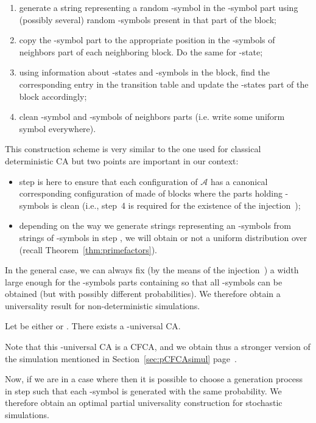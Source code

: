 \documentclass[submission]{fundam}
\newcommand\DELETE[1]{}
\newcommand{\AUTO}[1]{{\ensuremath{\mathcal{#1}}}}
\newcommand\CAA{\AUTO A}
\newcommand\CFCA{\textsf{CFCA}}
\begin{document}
{\begin{enumerate}
\item generate \DELETE{surjectively }a string representing a random -symbol in the \textsf{-symbol} part using (possibly several) random -symbols present in that part of the block;
\item copy the \textsf{-symbol} part to the appropriate position in the \textsf{-symbols of neighbors} part of each neighboring block. Do the same for \textsf{-state};
\item using information about -states and -symbols in the block, find the corresponding entry in the transition table and update the \textsf{-states} part of the block accordingly;
\item clean \textsf{-symbol} and \textsf{-symbols of neighbors} parts (i.e. write some uniform symbol everywhere).
\end{enumerate}

This construction scheme is very similar to the one used for classical deterministic CA but two points are important in our context:
\begin{itemize}
\item step  is here to ensure that each configuration of \CAA{} has a canonical corresponding configuration of  made of blocks where the parts holding -symbols is clean (i.e., step~4 is required for the existence of the injection~);
\item depending on the way we generate strings representing an -symbols from strings of -symbols in step , we will obtain or not a uniform distribution over  (recall Theorem~\ref{thm:primefactors}).
\end{itemize}

In the general case, we can always fix (by the means of the injection~) a  width large enough for the \textsf{-symbols} parts containing  so that all -symbols can be obtained (but with possibly different probabilities). We therefore obtain a universality result for non-deterministic simulations.

\begin{theorem}\label{thm:nondet:univ}
  Let  be either  or . There exists a -universal CA.
\end{theorem}

Note that this  -universal CA is a \CFCA, and we obtain thus a stronger version of the simulation mentioned in Section~\ref{sec:pCFCAsimul} page~\pageref{sec:pCFCAsimul}.

Now, if we are in a case where  then it is possible to choose a generation process in step  such that each -symbol is generated with the same probability. We therefore obtain an optimal partial universality construction for stochastic simulations.

}
\end{document}
